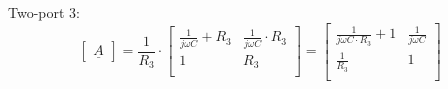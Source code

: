 \documentclass[a4paper]{article}
\begin{document}
Two-port 3:\\
\begin{equation*}
	\begin{bmatrix}
		\underline{A}
	\end{bmatrix}=
	\frac{1}{R_3} \cdot
	\begin{bmatrix}
		\frac{1}{j\omega C} + R_3 & \frac{1}{j\omega C} \cdot R_3\\
		1 & R_3\\
	\end{bmatrix} =
	\begin{bmatrix}
		\frac{1}{j\omega C \cdot R_3} + 1 & \frac{1}{j\omega C}\\
		\frac{1}{R_3} & 1\\
	\end{bmatrix}
\end{equation*}
\end{document}
